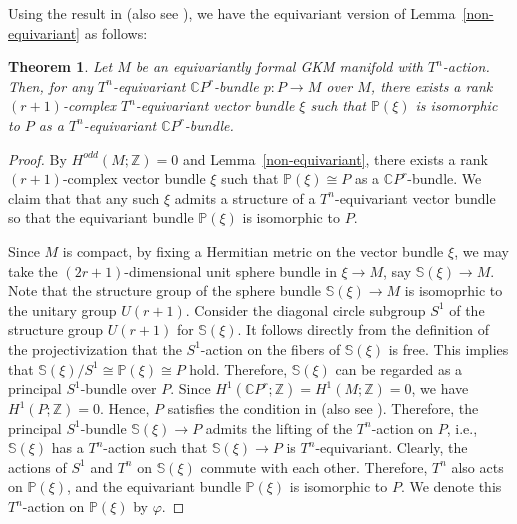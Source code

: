 \documentclass[12pt]{amsart}
\newtheorem{theorem}{Theorem}[section]
\theoremstyle{definition}
\theoremstyle{remark}
\numberwithin{equation}{section}
\newcommand{\C}{{\mathbb{C}}}
\renewcommand{\P}{{\mathbb{P}}}
\begin{document}
Using the result in \cite[Proposition 6.2]{Su} (also see \cite[Corollary 1.4]{HY}), we have the equivariant version of Lemma~\ref{non-equivariant} as follows:
\begin{theorem}
\label{equivariant-bundle}
Let $M$ be an equivariantly formal GKM manifold with $T^{n}$-action.
Then, for any $T^{n}$-equivariant $\C P^r$-bundle $p\colon P\to M$ over $M$, there exists a rank $(r+1)$-complex $T^{n}$-equivariant vector bundle $\xi$ such that $\P(\xi)$ is isomorphic to $P$ as a $T^{n}$-equivariant $\mathbb{C}P^{r}$-bundle.
\end{theorem}
\begin{proof}
By $H^{odd}(M;\mathbb{Z})=0$ and Lemma~\ref{non-equivariant}, there exists a rank $(r+1)$-complex vector bundle $\xi$ such that $\P(\xi)\cong P$ as a $\mathbb{C}P^{r}$-bundle.
We claim that that any such $\xi$ admits a structure of a $T^n$-equivariant vector bundle so that the equivariant bundle $\P(\xi)$ is isomorphic to $P$.

Since $M$ is compact,
by fixing a Hermitian metric on the vector bundle $\xi$, we may take the $(2r+1)$-dimensional unit sphere bundle in $\xi\to M$, say $\mathbb{S}(\xi)\to M$.
Note that the structure group of the sphere bundle $\mathbb{S}(\xi)\to M$ is isomoprhic to the unitary group $U(r+1)$.
Consider the diagonal circle subgroup $S^1$ of the structure group $U(r+1)$ for $\mathbb{S}(\xi)$.
It follows directly from the definition of the projectivization that the $S^1$-action on the fibers of $\mathbb{S}(\xi)$ is free.
This implies that $\mathbb{S}(\xi)/S^{1}\cong \P(\xi)\cong P$ hold.
Therefore, $\mathbb{S}(\xi)$ can be regarded as a principal $S^{1}$-bundle over $P$.
Since $H^{1}(\mathbb{C}P^{r};\mathbb{Z})=H^{1}(M;\mathbb{Z})=0$, we have $H^{1}(P;\mathbb{Z})=0$.
Hence, $P$ satisfies the condition in \cite[Proposition 6.2]{Su} (also see \cite[Corollary 1.4]{HY}).
Therefore, the principal $S^1$-bundle $\mathbb{S}(\xi)\to P$ admits the lifting of the $T^{n}$-action on $P$, i.e., $\mathbb{S}(\xi)$ has a $T^{n}$-action such that $\mathbb{S}(\xi)\to P$ is $T^{n}$-equivariant.
Clearly, the actions of $S^1$ and $T^n$ on $\mathbb{S}(\xi)$ commute with each other.
Therefore, $T^{n}$ also acts on $\mathbb{P}(\xi)$, and the equivariant bundle $\P(\xi)$ is isomorphic to $P$.
We denote this $T^{n}$-action on $\mathbb{P}(\xi)$ by $\varphi$.


\end{proof}
\end{document}
